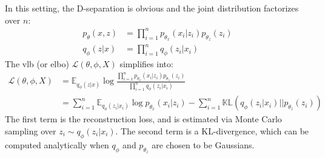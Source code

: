 In this setting, the D-separation is obvious and the joint distribution factorizes over $n$:
\begin{align*}
    p_{\theta}(x,z) &= \prod_{i=1}^n p_{\theta_x}(x_i \vert z_i) p_{\theta_z}(z_i) \\
    q_{\phi}(z \vert x) &= \prod_{i=1}^n q_{\phi}(z_i \vert x_i)
\end{align*}
The \gls{vlb} (or \gls{elbo}) $\mathcal{L}(\theta, \phi, X)$ simplifies into:
\begin{align*}
    \mathcal{L}(\theta, \phi, X) &= \mathbb{E}_{q_{\phi}(z \vert x)} \log{\frac{\prod_{i=1}^n p_{\theta_x}(x_i \vert z_i) p_{\theta_z}(z_i)}{\prod_{i=1}^n q_{\phi}(z_i \vert x_i)}} \\
    &= \sum_{i=1}^n \mathbb{E}_{q_{\phi}(z_i \vert x_i)} \log{p_{\theta_x}(x_i \vert z_i)} - \sum_{i=1}^n \mathbb{KL}(q_{\phi}(z_i \vert x_i) \vert\vert p_{\theta_z}(z_i) )
\end{align*}
The first term is the reconstruction loss, and is estimated via Monte Carlo sampling over $z_i \sim q_{\phi}(z_i \vert x_i)$. The second term is a KL-divergence, which can be computed analytically when $q_\phi$ and $p_{\theta_z}$ are chosen to be Gaussians.









